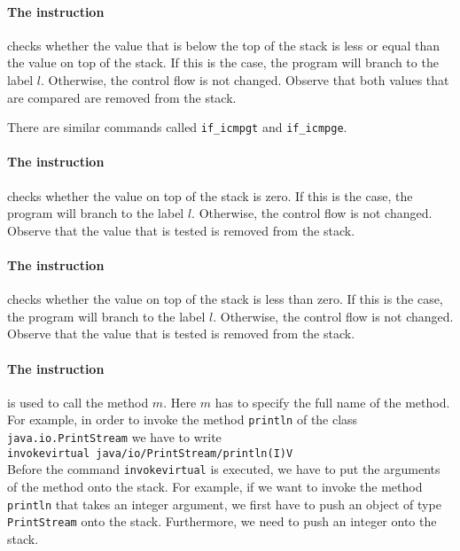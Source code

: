 \paragraph{The instruction }
checks whether the value that is below the top of the stack is less or equal than the value on top
of the stack.  If this is the case, the program will branch 
to the label $l$.  Otherwise, the control flow is not changed.  Observe that both values that are
compared are removed from the stack.

There are similar commands called \texttt{if\_icmpgt} and \texttt{if\_icmpge}.

\paragraph{The instruction }
checks whether the value on top of the stack is zero.  If this is the case, the program will branch
to the label $l$.  Otherwise, the control flow is not changed.  Observe that the value that is
tested is removed from the stack.


\paragraph{The instruction }
checks whether the value on top of the stack is less than zero.  If this is the case, the program
will branch to the label $l$.  Otherwise, the control flow is not changed.  Observe that the value
that is tested is removed from the stack.


\paragraph{The instruction }
is used to call the method $m$.  Here $m$ has to  specify the full name of the method.
For example, in order to invoke the method \texttt{println} of the class
\texttt{java.io.PrintStream} we have to write 
\\[0.2cm]
\hspace*{1.3cm}
\texttt{invokevirtual java/io/PrintStream/println(I)V}
\\[0.2cm]
Before the command \texttt{invokevirtual} is executed, we have to put the arguments of the method
onto the stack.  For example, if we want to invoke the method \texttt{println} that takes an integer
argument, we first have to push an object of type \texttt{PrintStream} onto the stack.  Furthermore,
we need to push an integer onto the stack.

